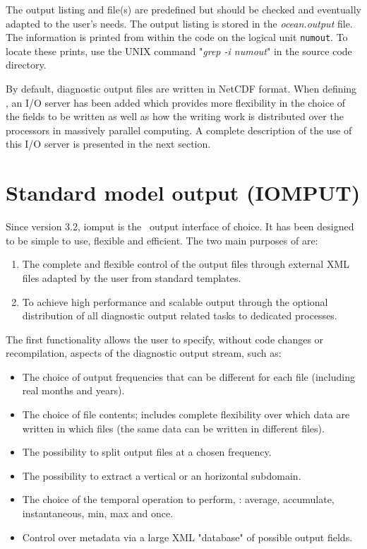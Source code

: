 \documentclass[../main/NEMO_manual]{subfiles}
\begin{document}
The output listing and file(s) are predefined but should be checked and eventually adapted to the user's needs.
The output listing is stored in the \textit{ocean.output} file.
The information is printed from within the code on the logical unit \texttt{numout}.
To locate these prints, use the UNIX command "\textit{grep -i numout}" in the source code directory.

By default, diagnostic output files are written in NetCDF format.
When defining , an I/O server has been added which
provides more flexibility in the choice of the fields to be written as well as how
the writing work is distributed over the processors in massively parallel computing.
A complete description of the use of this I/O server is presented in the next section.


\section{Standard model output (IOMPUT)}
\label{sec:DIA_iom}

Since version 3.2, iomput is the \NEMO\ output interface of choice.
It has been designed to be simple to use, flexible and efficient.
The two main purposes of  are:

\begin{enumerate}
\item The complete and flexible control of the output files through external XML files adapted by
  the user from standard templates.
\item To achieve high performance and scalable output through the optional distribution of
  all diagnostic output related tasks to dedicated processes.
\end{enumerate}

The first functionality allows the user to specify, without code changes or recompilation,
aspects of the diagnostic output stream, such as:

\begin{itemize}
\item The choice of output frequencies that can be different for each file (including real months and years).
\item The choice of file contents; includes complete flexibility over which data are written in which files
  (the same data can be written in different files).
\item The possibility to split output files at a chosen frequency.
\item The possibility to extract a vertical or an horizontal subdomain.
\item The choice of the temporal operation to perform, \eg: average, accumulate, instantaneous, min, max and once.
\item Control over metadata via a large XML "database" of possible output fields.
\end{itemize}
\end{document}
